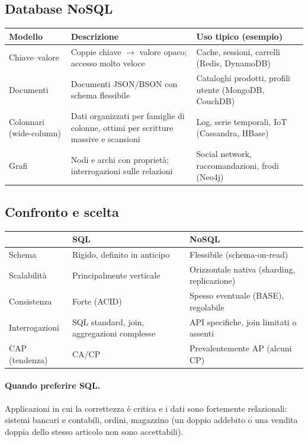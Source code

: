 \subsection{Database NoSQL}
\begin{center}
\begin{tabularx}{\textwidth}{@{}lXX@{}}
\toprule
\textbf{Modello} & \textbf{Descrizione} & \textbf{Uso tipico (esempio)} \\
\midrule
Chiave--valore & Coppie chiave $\to$ valore opaco; accesso molto veloce & Cache, sessioni, carrelli (Redis, DynamoDB) \\
Documenti & Documenti JSON/BSON con schema flessibile & Cataloghi prodotti, profili utente (MongoDB, CouchDB) \\
Colonnari (wide-column) & Dati organizzati per famiglie di colonne, ottimi per scritture massive e scansioni & Log, serie temporali, IoT (Cassandra, HBase) \\
Grafi & Nodi e archi con proprietà; interrogazioni sulle relazioni & Social network, raccomandazioni, frodi (Neo4j) \\
\bottomrule
\end{tabularx}
\end{center}

\subsection{Confronto e scelta}
\begin{center}
\begin{tabularx}{\textwidth}{@{}lXX@{}}
\toprule
 & \textbf{SQL} & \textbf{NoSQL} \\
\midrule
Schema & Rigido, definito in anticipo & Flessibile (schema-on-read) \\
Scalabilità & Principalmente verticale & Orizzontale nativa (sharding, replicazione) \\
Consistenza & Forte (ACID) & Spesso eventuale (BASE), regolabile \\
Interrogazioni & SQL standard, join, aggregazioni complesse & API specifiche, join limitati o assenti \\
CAP (tendenza) & CA/CP & Prevalentemente AP (alcuni CP) \\
\bottomrule
\end{tabularx}
\end{center}

\paragraph{Quando preferire SQL.} Applicazioni in cui la correttezza è critica e i dati sono fortemente relazionali: sistemi bancari e contabili, ordini, magazzino (un doppio addebito o una vendita doppia dello stesso articolo non sono accettabili).

